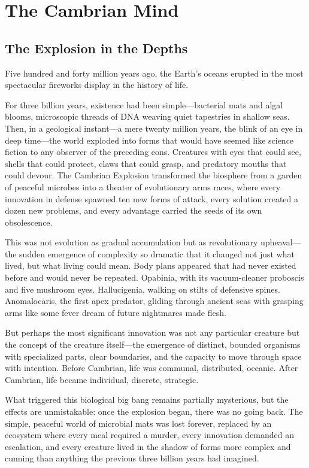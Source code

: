 \chapter{The Cambrian Mind}

\section{The Explosion in the Depths}

Five hundred and forty million years ago, the Earth's oceans erupted in the most spectacular fireworks display in the history of life.

For three billion years, existence had been simple—bacterial mats and algal blooms, microscopic threads of DNA weaving quiet tapestries in shallow seas. Then, in a geological instant—a mere twenty million years, the blink of an eye in deep time—the world exploded into forms that would have seemed like science fiction to any observer of the preceding eons. Creatures with eyes that could see, shells that could protect, claws that could grasp, and predatory mouths that could devour. The Cambrian Explosion transformed the biosphere from a garden of peaceful microbes into a theater of evolutionary arms races, where every innovation in defense spawned ten new forms of attack, every solution created a dozen new problems, and every advantage carried the seeds of its own obsolescence.

This was not evolution as gradual accumulation but as revolutionary upheaval—the sudden emergence of complexity so dramatic that it changed not just what lived, but what living could mean. Body plans appeared that had never existed before and would never be repeated. Opabinia, with its vacuum-cleaner proboscis and five mushroom eyes. Hallucigenia, walking on stilts of defensive spines. Anomalocaris, the first apex predator, gliding through ancient seas with grasping arms like some fever dream of future nightmares made flesh.

But perhaps the most significant innovation was not any particular creature but the concept of the creature itself—the emergence of distinct, bounded organisms with specialized parts, clear boundaries, and the capacity to move through space with intention. Before Cambrian, life was communal, distributed, oceanic. After Cambrian, life became individual, discrete, strategic.

What triggered this biological big bang remains partially mysterious, but the effects are unmistakable: once the explosion began, there was no going back. The simple, peaceful world of microbial mats was lost forever, replaced by an ecosystem where every meal required a murder, every innovation demanded an escalation, and every creature lived in the shadow of forms more complex and cunning than anything the previous three billion years had imagined.

